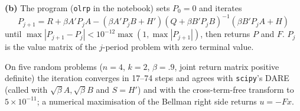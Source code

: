 \documentclass[12pt, letterpaper]{article}
\begin{document}
\begin{tcolorbox}[oddbox,title={Exercise 5.1 \quad Riccati equation with a cross-product term}]
\textbf{(b)} The program (\texttt{olrp} in the notebook) sets $P_0=0$ and iterates
\[
P_{j+1}=R+\beta A'P_jA-(\beta A'P_jB+H')(Q+\beta B'P_jB)^{-1}(\beta B'P_jA+H)
\]
until $\max|P_{j+1}-P_j|<10^{-12}\max(1,\max|P_{j+1}|)$, then returns $P$ and $F$. $P_j$ is the
value matrix of the $j$-period problem with zero terminal value.

\begin{tcolorbox}[databox]
On five random problems ($n=4$, $k=2$, $\beta=.9$, joint return matrix positive definite) the
iteration converges in 17--74 steps and agrees with \texttt{scipy}'s DARE (called with
$\sqrt\beta A,\sqrt\beta B$ and $S=H'$) and with the cross-term-free transform to $5\times10^{-11}$; a
numerical maximisation of the Bellman right side returns $u=-Fx$.
\end{tcolorbox}
\end{tcolorbox}
\end{document}
